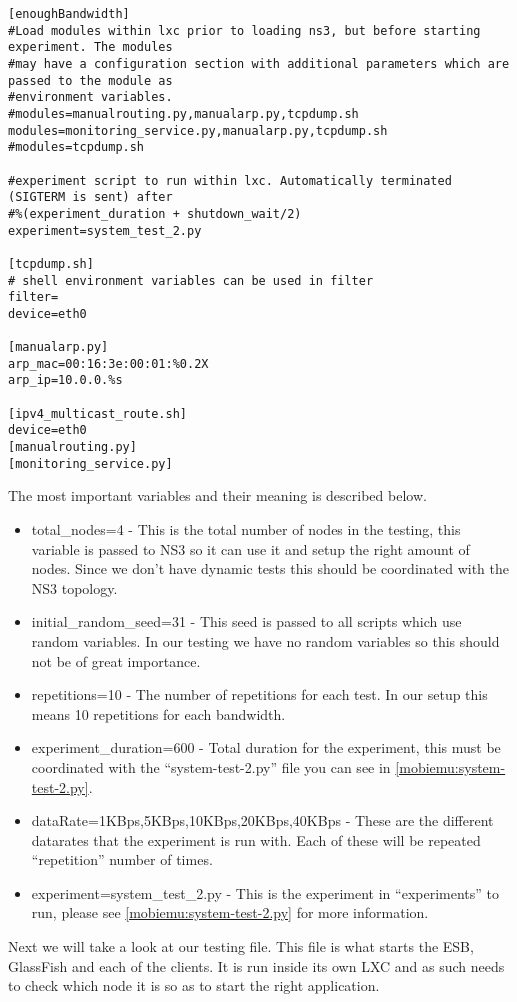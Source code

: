 \begin{lstlisting}[frame=single, caption={Setting.cfg}, label=mobiemu:setting.cfg, breaklines=true]
[enoughBandwidth]
#Load modules within lxc prior to loading ns3, but before starting experiment. The modules
#may have a configuration section with additional parameters which are passed to the module as
#environment variables.
#modules=manualrouting.py,manualarp.py,tcpdump.sh
modules=monitoring_service.py,manualarp.py,tcpdump.sh
#modules=tcpdump.sh

#experiment script to run within lxc. Automatically terminated (SIGTERM is sent) after
#%(experiment_duration + shutdown_wait/2)
experiment=system_test_2.py

[tcpdump.sh]
# shell environment variables can be used in filter
filter=
device=eth0

[manualarp.py]
arp_mac=00:16:3e:00:01:%0.2X
arp_ip=10.0.0.%s

[ipv4_multicast_route.sh]
device=eth0
[manualrouting.py]
[monitoring_service.py]
\end{lstlisting}

The most important variables and their meaning is described below.

\begin{itemize}
\item total\_nodes=4 - This is the total number of nodes in the testing, this variable is passed to NS3 so it can use it and setup the right amount of nodes. Since we don’t have dynamic tests this should be coordinated with the NS3 topology.
\item initial\_random\_seed=31 - This seed is passed to all scripts which use random variables. In our testing we have no random variables so this should not be of great importance.
\item repetitions=10 - The number of repetitions for each test. In our setup this means 10 repetitions for each bandwidth.
\item experiment\_duration=600 - Total duration for the experiment, this must be coordinated with the “system-test-2.py” file you can see in \ref{mobiemu:system-test-2.py}.
\item dataRate=1KBps,5KBps,10KBps,20KBps,40KBps - These are the different datarates that the experiment is run with. Each of these will be repeated “repetition” number of times.
\item experiment=system\_test\_2.py - This is the experiment in “experiments” to run, please see \ref{mobiemu:system-test-2.py} for more information.
\end{itemize}

Next we will take a look at our testing file. This file is what starts the ESB, GlassFish and each of the clients. It is run inside its own LXC and as such needs to check which node it is so as to start the right application.

